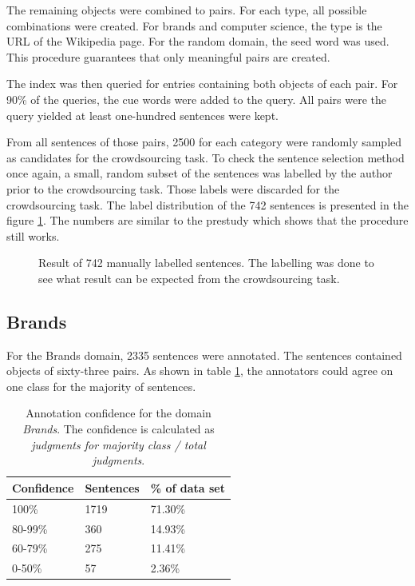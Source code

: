 The remaining objects were combined to pairs. For each type, all possible combinations were created. For brands and computer science, the type is the URL of the Wikipedia page. For the random domain, the seed word was used. This procedure guarantees that only meaningful pairs are created.




The index was then queried for entries containing both objects of each pair. For 90\% of the queries, the cue words were added to the query. All pairs were the query yielded at least one-hundred sentences were kept.

From all sentences of those pairs, 2500 for each category were randomly sampled as candidates for the crowdsourcing task. To check the sentence selection method once again, a small, random subset of the sentences was labelled by the author prior to the crowdsourcing task. Those labels were discarded for the crowdsourcing task.
The label distribution of the 742 sentences is presented in the figure \ref{fig:sample}. The numbers are similar to the prestudy which shows that the procedure still works.


\begin{figure}[h]
\centering
\caption{Result of 742 manually labelled sentences. The labelling was done to see what result can be expected from the crowdsourcing task.}
\label{fig:sample}
\end{figure}

\subsection{Brands}
\label{sec:brands}

For the Brands domain, 2335 sentences were annotated. The sentences contained objects of sixty-three pairs. As shown in table \ref{fig:brand_agg}, the annotators could agree on one class for the majority of sentences.


\begin{table}[h]
\caption{Annotation confidence for the domain \emph{Brands}. The confidence is calculated as \emph{judgments for majority class / total judgments}.}
\label{fig:brand_agg}
\begin{tabularx}{\textwidth}{XXX}
\toprule
Confidence & Sentences & \% of data set \\
\midrule
100\%	&	1719	&	71.30\%	 \\ 
80-99\%	&	360	&	14.93\%	 \\ 
60-79\%	&	275	&	11.41\%	 \\ 
0-50\%	&	57	&	2.36\%	 \\ 
\bottomrule
\end{tabularx}
\end{table}



